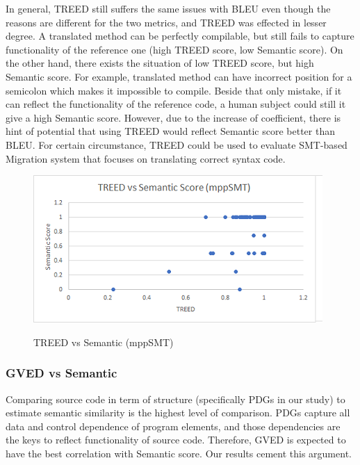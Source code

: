
In general, TREED still suffers the same issues with BLEU even though the reasons are different for the two metrics, and TREED was effected in lesser degree. A translated method can be perfectly compilable, but still fails to capture functionality of the reference one (high TREED score, low Semantic score). On the other hand, there exists the situation of low TREED score, but high Semantic score. For example, translated method can have incorrect position for a semicolon which makes it impossible to compile. Beside that only mistake, if it can reflect the functionality of the reference code, a human subject could still it give a high Semantic score. However, due to the increase of coefficient, there is hint of potential that using TREED would reflect Semantic score better than BLEU. For certain circumstance, TREED could be used to evaluate SMT-based Migration system that focuses on translating correct syntax code. 

%
\begin{figure}
\caption{TREED vs Semantic (mppSMT)}
\centering
\includegraphics{img/treed_mppSMT.png}
\label{fig:TREEDmppSMT}
\end{figure}

\subsubsection{\textbf{GVED vs Semantic}}
Comparing source code in term of structure (specifically PDGs in our study) to estimate semantic similarity is the 
highest level of comparison. PDGs capture all data and control dependence of program elements, and those dependencies are the keys to reflect functionality of source code. Therefore, GVED is expected to have the best correlation with Semantic score. Our results cement this argument. 

